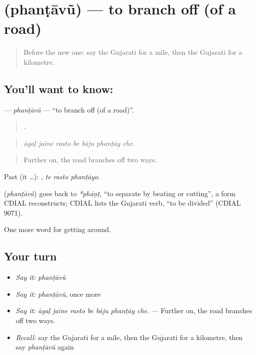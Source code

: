 \section[\texorpdfstring{\gu{ફંટાવું} (phanṭāvũ)}{ફંટાવું (phanṭāvũ)}]{ (phanṭāvũ) — to branch off (of a road)}

\label{lesson:GU-C403-phantavu}



\begin{quote}
Before the new one: say the Gujarati for a mile, then the Gujarati for a kilometre.
\end{quote}

\subsection*{You'll want to know: }
\textbf{} — \emph{phanṭāvũ} — \textquotedblleft{}to branch off (of a road)\textquotedblright{}.

\begin{quote}
      .
\end{quote}

\begin{quote}
\emph{āgaḷ jaīne rasto be bāju phanṭāy che.}
\end{quote}

\begin{quote}
Further on, the road branches off two ways.
\end{quote}

Past (it …):   , \emph{te rasto phanṭāyo}.

\begin{cousinweb}
\textbf{} (\emph{phanṭāvũ}) goes back to \emph{*phāṇṭ}, \textquotedblleft{}to separate by beating or cutting\textquotedblright{}, a form CDIAL reconstructs; CDIAL lists the Gujarati verb, \textquotedblleft{}to be divided\textquotedblright{} (CDIAL 9071).
\end{cousinweb}

\begin{grammarlens}[title={What you've built}]
One more word for getting around.
\end{grammarlens}

\subsection*{Your turn}
\begin{itemize}
\raggedright
  \item \emph{Say it:} \emph{phanṭāvũ}
  \item \emph{Say it:} \emph{phanṭāvũ}, once more
  \item \emph{Say it:} \emph{āgaḷ jaīne rasto be bāju phanṭāy che.} — Further on, the road branches off two ways.
  \item \emph{Recall:} say the Gujarati for a mile, then the Gujarati for a kilometre, then say \emph{phanṭāvũ} again
\end{itemize}

